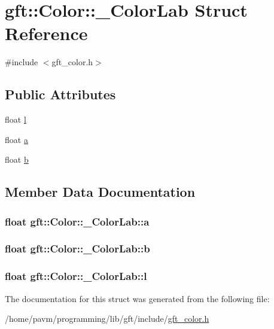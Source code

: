 \hypertarget{structgft_1_1Color_1_1__ColorLab}{\section{gft\-:\-:Color\-:\-:\-\_\-\-Color\-Lab Struct Reference}
\label{structgft_1_1Color_1_1__ColorLab}
}


{\ttfamily \#include $<$gft\-\_\-color.\-h$>$}

\subsection*{Public Attributes}
\begin{DoxyCompactItemize}
\item 
float \hyperlink{structgft_1_1Color_1_1__ColorLab_a918ca704474fa4a998b3b6a9533c628e}{l}
\item 
float \hyperlink{structgft_1_1Color_1_1__ColorLab_ac566f89dc8eb72bfd965622f73dffce1}{a}
\item 
float \hyperlink{structgft_1_1Color_1_1__ColorLab_ab2f7906ded3cbbf64a040c26979f4223}{b}
\end{DoxyCompactItemize}


\subsection{Member Data Documentation}
\hypertarget{structgft_1_1Color_1_1__ColorLab_ac566f89dc8eb72bfd965622f73dffce1}{
\subsubsection[{a}]{\setlength{\rightskip}{0pt plus 5cm}float gft\-::\-Color\-::\-\_\-\-Color\-Lab\-::a}}\label{structgft_1_1Color_1_1__ColorLab_ac566f89dc8eb72bfd965622f73dffce1}
\hypertarget{structgft_1_1Color_1_1__ColorLab_ab2f7906ded3cbbf64a040c26979f4223}{
\subsubsection[{b}]{\setlength{\rightskip}{0pt plus 5cm}float gft\-::\-Color\-::\-\_\-\-Color\-Lab\-::b}}\label{structgft_1_1Color_1_1__ColorLab_ab2f7906ded3cbbf64a040c26979f4223}
\hypertarget{structgft_1_1Color_1_1__ColorLab_a918ca704474fa4a998b3b6a9533c628e}{
\subsubsection[{l}]{\setlength{\rightskip}{0pt plus 5cm}float gft\-::\-Color\-::\-\_\-\-Color\-Lab\-::l}}\label{structgft_1_1Color_1_1__ColorLab_a918ca704474fa4a998b3b6a9533c628e}


The documentation for this struct was generated from the following file\-:\begin{DoxyCompactItemize}
\item 
/home/pavm/programming/lib/gft/include/\hyperlink{gft__color_8h}{gft\-\_\-color.\-h}\end{DoxyCompactItemize}
